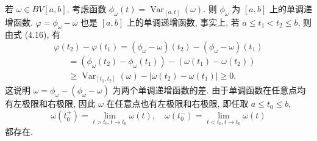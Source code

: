 \documentclass[openany]{ctexbook}
\theoremstyle{kaiti}
\theoremstyle{normal}
\begin{document}
若 $\omega \in BV[a, b]$, 考虑函数 $\phi_{\omega}(t)=\operatorname{Var}_{[a, t]}(\omega)$. 则 $\phi_{\omega}$ 为 $[a, b]$ 上的单调递增函数. $\varphi=\phi_{\omega}-\omega$ 也是 $[a, b]$ 上的单调递增函数, 事实上, 若 $a \leqslant t_1<t_2 \leqslant b$, 则由式 (4.16), 有
$$
\varphi\left(t_2\right)-\varphi\left(t_1\right)=\left(\phi_{\omega}-\omega\right)\left(t_2\right)-\left(\phi_{\omega}-\omega\right)\left(t_1\right)
$$
$$
\begin{aligned}
&=\left(\phi_{\omega}\left(t_2\right)-\phi_{\omega}\left(t_1\right)\right)-\left(\omega\left(t_1\right)-\omega\left(t_2\right)\right) \\
&\geqslant \operatorname{Var}_{\left[t_1, t_2\right]}(\omega)-\left|\omega\left(t_2\right)-\omega\left(t_1\right)\right| \geqslant 0.
\end{aligned}
$$
这说明 $\omega=\phi_{\omega}-\left(\phi_{\omega}-\omega\right)$ 为两个单调递增函数的差. 由于单调函数在任意点均有左极限和右极限, 因此 $\omega$ 在任意点也有左极限和右极限, 即任取 $a \leqslant t_0 \leqslant b$,
$$
\omega\left(t_0^{+}\right)=\lim_{t>t_0, t \rightarrow t_0} \omega(t), \quad \omega\left(t_0^{-}\right)=\lim_{t<t_0, t \rightarrow t_0} \omega(t)
$$
都存在.
\end{document}
